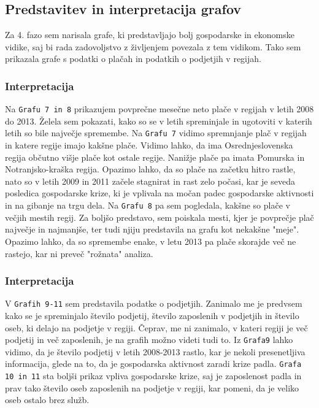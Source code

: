 \documentclass[11pt,a4paper]{article}
\begin{document}
\subsection{Predstavitev in interpretacija grafov}
Za 4. fazo sem narisala grafe, ki predstavljajo bolj gospodarske in ekonomske vidike, saj bi rada zadovoljstvo z življenjem povezala z tem vidikom. Tako sem prikazala grafe s podatki o plačah in podatkih o podjetjih v regijah.

\subsubsection{Interpretacija}
Na \verb+Grafu 7 in 8+ prikazujem povprečne mesečne neto plače v regijah v letih 2008 do 2013. Želela sem pokazati, kako so se v letih spreminjale in ugotoviti v katerih letih so bile največje spremembe. Na \verb+Grafu 7+ vidimo spremnjanje plač v regijah in katere regije imajo kakšne plače. Vidimo lahko, da ima Osrednjeslovenska regija občutno višje plače kot ostale regije. Nanižje plače pa imata Pomurska in Notranjsko-kraška regija. Opazimo lahko, da so plače na začetku hitro rastle, nato so v letih 2009 in 2011 začele stagnirat in rast zelo počasi, kar je seveda posledica gospodarske krize, ki je vplivala na močan padec gospodarske aktivnosti in na gibanje na trgu dela. 
Na \verb+Grafu 8+ pa sem pogledala, kakšne so plače v večjih mestih regij. Za boljšo predstavo, sem poiskala mesti, kjer je povprečje plač največje in najmanjše, ter tudi njiju predstavila na grafu kot nekakšne "meje". Opazimo lahko, da so spremembe enake, v letu 2013 pa plače skorajde več ne rastejo, kar ni preveč "rožnata" analiza.

\subsubsection{Interpretacija}
V \verb+Grafih 9-11+ sem predstavila podatke o podjetjih. Zanimalo me je predvsem kako se je spreminjalo število podjetij, število zaposlenih v podjetjih in število oseb, ki delajo na podjetje v regiji. Čeprav, me ni zanimalo, v kateri regiji je več podjetij in več zaposlenih, je na grafih možno videti tudi to. Iz \verb+Grafa9+ lahko vidimo, da je število podjetij v letih 2008-2013 rastlo, kar je nekoli presenetljiva informacija, glede na to, da je gospodarska aktivnost zaradi krize padla. \verb+Grafa 10 in 11+ sta boljši prikaz vpliva gospodarske krize, saj je zaposlenost padla in prav tako število oseb zaposlenih na podjetje v regiji, kar pomeni, da je veliko oseb ostalo brez služb. 
\end{document}
